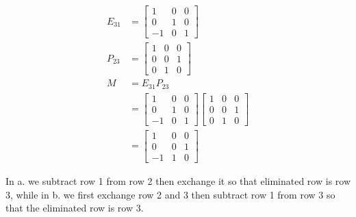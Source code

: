 \documentclass[main.tex]{subfiles}
\begin{document}
\begin{enumerate}
\begin{enumerate}
            $$
            \begin{aligned}
            E_{31} & = \left[\begin{array}{ccc}
            1 & 0 & 0 \\
            0 & 1 & 0 \\
            -1 & 0 & 1
            \end{array}\right] \\
            P_{23} & = \left[\begin{array}{ccc}
            1 & 0 & 0 \\
            0 & 0 & 1 \\
            0 & 1 & 0
            \end{array}\right] \\
            M & =E_{31} P_{23} \\
            & =\left[\begin{array}{ccc}
            1 & 0 & 0 \\
            0 & 1 & 0 \\
            -1 & 0 & 1
            \end{array}\right]\left[\begin{array}{lll}
            1 & 0 & 0 \\
            0 & 0 & 1 \\
            0 & 1 & 0
            \end{array}\right] \\
            & =\left[\begin{array}{ccc}
            1 & 0 & 0 \\
            0 & 0 & 1 \\
            -1 & 1 & 0
            \end{array}\right]
            \end{aligned}
            $$
            
            In a. we subtract row 1 from row 2 then exchange it so that eliminated row is row 3, while in b. we first exchange row 2 and 3 then subtract row 1 from row 3 so that the eliminated row is row 3.
            
        \end{enumerate}
        

\end{enumerate}
\end{document}
